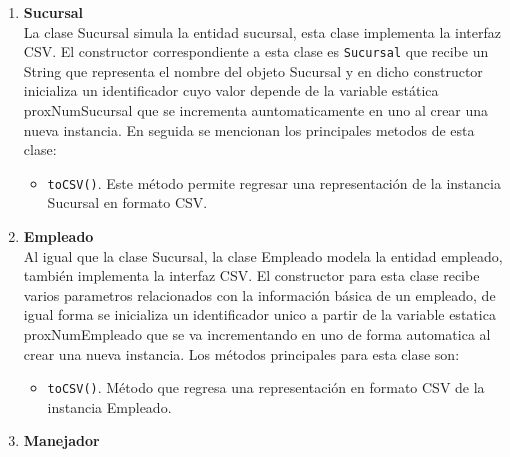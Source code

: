 \documentclass[10pt]{article}
\begin{document}
    \begin{enumerate}
    	\item {\bf{Sucursal}} \\
    	
    	La clase Sucursal simula la entidad sucursal, esta clase implementa la interfaz CSV. El constructor correspondiente a esta clase es  {\texttt{Sucursal}} que recibe un String que representa el nombre del objeto Sucursal y en dicho constructor inicializa un identificador cuyo valor depende de la variable estática proxNumSucursal que se incrementa auntomaticamente en uno al crear una nueva instancia. En seguida se mencionan los principales metodos de esta clase:
    	
    	\begin{itemize}
    		
    		\item {\texttt{toCSV()}}. Este método permite regresar una representación de la instancia Sucursal en formato CSV.\\
    	\end{itemize} 
    	
    	
    	
    	\item {\bf{Empleado}}\\
    	
    	Al igual que la clase Sucursal, la clase Empleado modela la entidad empleado, también implementa la interfaz CSV. El constructor para esta clase recibe varios parametros relacionados con la información básica de un empleado, de igual forma se inicializa un identificador unico a partir de la variable estatica proxNumEmpleado que se va incrementando en uno de forma automatica al crear una nueva instancia.
    	Los métodos principales para esta clase son:\\
    	
    	\begin{itemize}
    		\item {\texttt{toCSV()}}. Método que regresa una representación en formato CSV de la instancia Empleado.\\
    	\end{itemize}
    	
    	\item {\bf{Manejador}}\\
    	

\end{enumerate}
\end{document}
